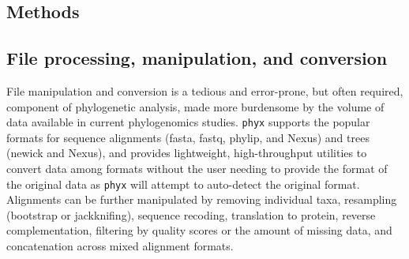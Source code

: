 \documentclass{bioinfo}
\begin{document}
\begin{methods}
\section{Methods}


\subsection{File processing, manipulation, and conversion}

File manipulation and conversion is a tedious and error-prone, but often required,
component of phylogenetic analysis, made more burdensome by the volume of data
available in current phylogenomics studies. \texttt{phyx} supports the
popular formats for sequence alignments (fasta, fastq, phylip, and Nexus)
and trees (newick and Nexus), and provides lightweight, high-throughput
utilities to convert data among formats without the user needing to
provide the format of the original data as \texttt{phyx} will attempt to auto-detect the original format. Alignments can be further
manipulated by removing individual taxa, resampling (bootstrap or
jackknifing), sequence recoding, translation to protein, reverse
complementation, filtering by quality scores or the amount of missing
data, and concatenation across mixed alignment formats. 


\end{methods}
\end{document}
